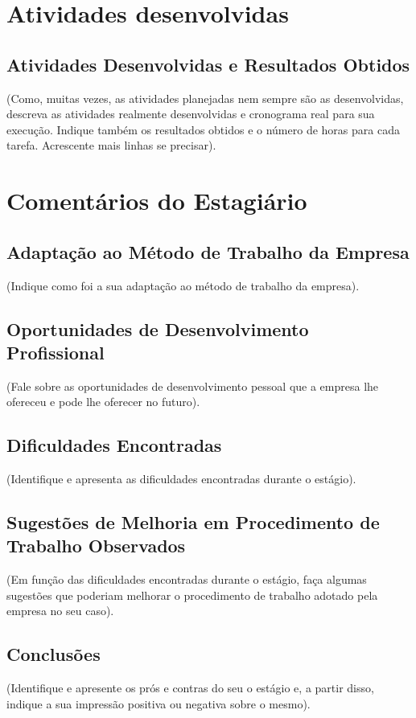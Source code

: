 \documentclass[
	12pt,				%
	openright,			%
	oneside,			%
	a4paper,			%
	english,			%
	french,				%
	spanish,			%
	brazil				%
	]{abntex2}
\begin{document}
\chapter{Atividades desenvolvidas}
\section{Atividades Desenvolvidas e Resultados Obtidos}

(Como, muitas vezes, as atividades planejadas nem sempre são as desenvolvidas,
descreva as atividades realmente desenvolvidas e cronograma real para sua execução.
Indique também os resultados obtidos e o número de horas para cada tarefa. Acrescente
mais linhas se precisar).

\chapter{Comentários do Estagiário}
\section{Adaptação ao Método de Trabalho da Empresa}
(Indique como foi a sua adaptação ao método de trabalho da empresa).

\section{Oportunidades de Desenvolvimento Profissional}
(Fale sobre as oportunidades de desenvolvimento pessoal que a empresa lhe ofereceu e pode lhe oferecer no futuro).

\section{Dificuldades Encontradas}
(Identifique e apresenta as dificuldades encontradas durante o estágio).

\section{Sugestões de Melhoria em Procedimento de Trabalho Observados}
(Em função das dificuldades encontradas durante o estágio, faça algumas sugestões que poderiam melhorar o procedimento de trabalho adotado pela empresa no seu caso).

\section*{Conclusões}
(Identifique e apresente os prós e contras do seu o estágio e, a partir disso, indique a sua impressão positiva ou negativa sobre o mesmo).
\end{document}
